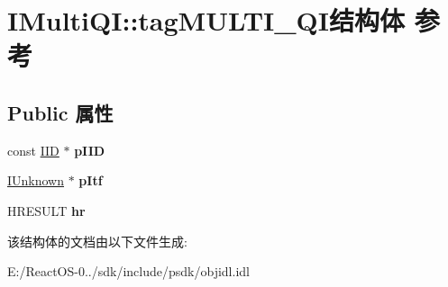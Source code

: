 \hypertarget{struct_i_multi_q_i_1_1tag_m_u_l_t_i___q_i}{}\section{I\+Multi\+QI\+:\+:tag\+M\+U\+L\+T\+I\+\_\+\+Q\+I结构体 参考}
\label{struct_i_multi_q_i_1_1tag_m_u_l_t_i___q_i}
\subsection*{Public 属性}
\begin{DoxyCompactItemize}
\item 
\mbox{\label{struct_i_multi_q_i_1_1tag_m_u_l_t_i___q_i_a848e6272ba64f45b528b60438f485067}} 
const \hyperlink{struct___i_i_d}{I\+ID} $\ast$ {\bfseries p\+I\+ID}
\item 
\mbox{\label{struct_i_multi_q_i_1_1tag_m_u_l_t_i___q_i_a47f2792ba88db08f53d1b7e340889bf3}} 
\hyperlink{interface_i_unknown}{I\+Unknown} $\ast$ {\bfseries p\+Itf}
\item 
\mbox{\label{struct_i_multi_q_i_1_1tag_m_u_l_t_i___q_i_abf656de337ed7d13590f9fc7019b114f}} 
H\+R\+E\+S\+U\+LT {\bfseries hr}
\end{DoxyCompactItemize}


该结构体的文档由以下文件生成\+:\begin{DoxyCompactItemize}
\item 
E\+:/\+React\+O\+S-\/0../sdk/include/psdk/objidl.\+idl\end{DoxyCompactItemize}
